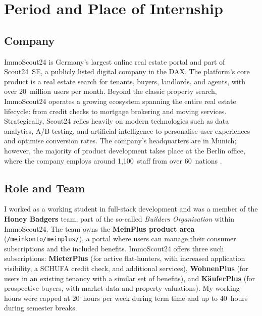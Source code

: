 \documentclass[a4paper, 12pt]{article}
\let\oldsection\section
\renewcommand{\section}{\clearpage\oldsection}
\begin{document}
\maketitle
\newpage

\tableofcontents
\newpage


\section{Period and Place of Internship}

\subsection{Company}

ImmoScout24 is Germany's largest online real estate portal and part of Scout24~SE,
a publicly listed digital company in the DAX. The platform's core product is a real
estate search for tenants, buyers, landlords, and agents, with over 20~million users
per month. Beyond the classic property search, ImmoScout24 operates a growing
ecosystem spanning the entire real estate lifecycle: from credit checks to mortgage
brokering and moving services. Strategically, Scout24 relies heavily on modern
technologies such as data analytics, A/B testing, and artificial intelligence to
personalise user experiences and optimise conversion rates. The company's headquarters
are in Munich; however, the majority of product development takes place at the Berlin
office, where the company employs around 1,100~staff from over 60~nations
\cite{scout24-about, scout24-unternehmen}.

\subsection{Role and Team}

I worked as a working student in full-stack development and was a member of the
\textbf{Honey Badgers} team, part of the so-called \emph{Builders Organisation} within
ImmoScout24. The team owns the \textbf{MeinPlus product area}
(\texttt{/meinkonto/meinplus/}), a portal where users can manage their consumer
subscriptions and the included benefits. ImmoScout24 offers three such subscriptions:
\textbf{MieterPlus} (for active flat-hunters, with increased application visibility,
a SCHUFA credit check, and additional services), \textbf{WohnenPlus} (for users in
an existing tenancy with a similar set of benefits), and \textbf{KäuferPlus} (for
prospective buyers, with market data and property valuations). My working hours were
capped at 20~hours per week during term time and up to 40~hours during semester
breaks.
\end{document}
